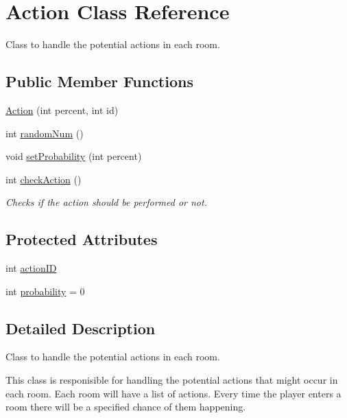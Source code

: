 \hypertarget{classAction}{}\section{Action Class Reference}
\label{classAction}


Class to handle the potential actions in each room.  


\subsection*{Public Member Functions}
\begin{DoxyCompactItemize}
\item 
\hyperlink{classAction_ac44cecf91b8611697fd5869bcce71ff3}{Action} (int percent, int id)
\item 
int \hyperlink{classAction_afd607ef9307a73a24ad0312f446ea359}{random\+Num} ()
\item 
void \hyperlink{classAction_a91259689b220c1de661b33ba88e19f7d}{set\+Probability} (int percent)
\item 
int \hyperlink{classAction_ae29bd65a917a4a16ba6a346773de56be}{check\+Action} ()
\begin{DoxyCompactList}\small\item\em Checks if the action should be performed or not. \end{DoxyCompactList}\end{DoxyCompactItemize}
\subsection*{Protected Attributes}
\begin{DoxyCompactItemize}
\item 
int \hyperlink{classAction_a52353c233ba7b04c7cd74762a4f86670}{action\+I\+D}
\item 
int \hyperlink{classAction_a8ce515cabf3656359a07f0b863059846}{probability} = 0
\end{DoxyCompactItemize}


\subsection{Detailed Description}
Class to handle the potential actions in each room. 

This class is responisible for handling the potential actions that might occur in each room. Each room will have a list of actions. Every time the player enters a room there will be a specified chance of them happening. 


